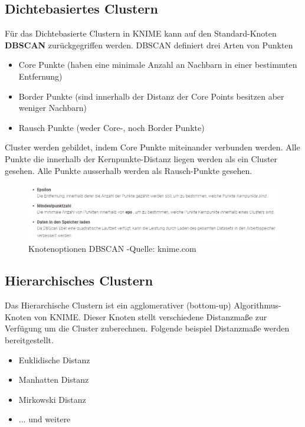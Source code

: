 \documentclass[12pt,					%
							 oneside,			%
							 a4paper,			%
							 halfparskip,		%
							 liststotoc,			%
							 bibtotoc,			%
							 fleqn,				%
							 pointlessnumbers]	%
							 {scrreprt}
\begin{document}
		\subsection{Dichtebasiertes Clustern}
		Für das Dichtebasierte Clustern in KNIME kann auf den Standard-Knoten \textbf{DBSCAN} zurückgegriffen werden.
		DBSCAN definiert drei Arten von Punkten
		\begin{itemize}
		\item Core Punkte (haben eine minimale Anzahl an Nachbarn in einer bestimmten Entfernung)
		\item Border Punkte (sind innerhalb der Distanz der Core Points besitzen aber weniger Nachbarn)
		\item Rausch Punkte (weder Core-, noch Border Punkte)
		\end{itemize}
		\newpage
		Cluster werden gebildet, indem Core Punkte miteinander verbunden werden. Alle Punkte die innerhalb der Kernpunkte-Distanz liegen werden als ein Cluster gesehen. Alle Punkte ausserhalb werden als Rausch-Punkte gesehen.
		
		\begin{figure}[h]
			\begin{center}
				\includegraphics[scale=0.7]{pictures/db-opt.png}
				\caption{Knotenoptionen DBSCAN -Quelle: knime.com}									
			\end{center}
		\end{figure}
		
		\subsection{Hierarchisches Clustern}
		Das Hierarchische Clustern ist ein agglomerativer (bottom-up) Algorithmus-Knoten von KNIME. Dieser Knoten stellt verschiedene Distanzmaße zur Verfügung um die Cluster zuberechnen. Folgende beispiel Distanzmaße werden bereitgestellt.
		
		\begin{itemize}
		\item Euklidische Distanz
		\item Manhatten Distanz
		\item Mirkowski Distanz
		\item ... und weitere
		\end{itemize}
		
\end{document}
